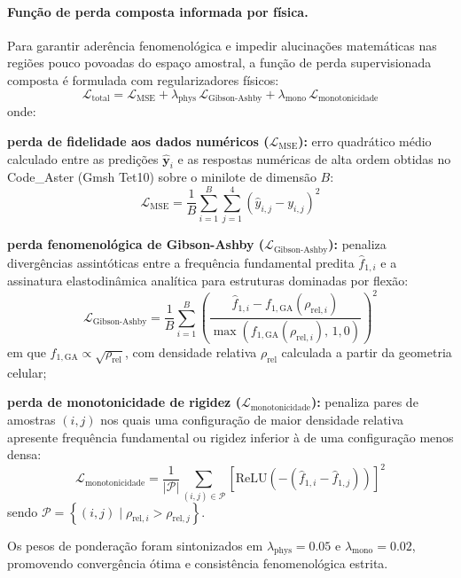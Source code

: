 \paragraph*{Função de perda composta informada por física.}
\label{par:perda}
Para garantir aderência fenomenológica e impedir alucinações matemáticas nas regiões pouco povoadas do espaço amostral, a função de perda supervisionada composta é formulada com regularizadores físicos:
\begin{equation}
  \mathcal{L}_{\text{total}} = \mathcal{L}_{\text{MSE}} + \lambda_{\text{phys}}\,\mathcal{L}_{\text{Gibson-Ashby}} + \lambda_{\text{mono}}\,\mathcal{L}_{\text{monotonicidade}}
  \label{eq:perda-total}
\end{equation}
onde:
\begin{alineas}
  \item \textbf{perda de fidelidade aos dados numéricos ($\mathcal{L}_{\text{MSE}}$):} erro quadrático médio calculado entre as predições $\hat{\mathbf{y}}_i$ e as respostas numéricas de alta ordem obtidas no Code\_Aster (Gmsh Tet10) sobre o minilote de dimensão $B$:
  \begin{equation}
    \mathcal{L}_{\text{MSE}} = \frac{1}{B} \sum_{i=1}^{B} \sum_{j=1}^{4} \left( \hat{y}_{i,j} - y_{i,j} \right)^{2}
    \label{eq:mse}
  \end{equation}
  \item \textbf{perda fenomenológica de Gibson-Ashby ($\mathcal{L}_{\text{Gibson-Ashby}}$):} penaliza divergências assintóticas entre a frequência fundamental predita $\hat{f}_{1,i}$ e a assinatura elastodinâmica analítica para estruturas dominadas por flexão:
  \begin{equation}
    \mathcal{L}_{\text{Gibson-Ashby}} = \frac{1}{B} \sum_{i=1}^{B} \left( \frac{\hat{f}_{1,i} - f_{1,\text{GA}}(\rho_{\text{rel},i})}{\max\!\left( f_{1,\text{GA}}(\rho_{\text{rel},i}),\, 1{,}0 \right)} \right)^{2}
    \label{eq:ga}
  \end{equation}
  em que $f_{1,\text{GA}} \propto \sqrt{\rho_{\text{rel}}}$, com densidade relativa $\rho_{\text{rel}}$ calculada a partir da geometria celular;
  \item \textbf{perda de monotonicidade de rigidez ($\mathcal{L}_{\text{monotonicidade}}$):} penaliza pares de amostras $(i,j)$ nos quais uma configuração de maior densidade relativa apresente frequência fundamental ou rigidez inferior à de uma configuração menos densa:
  \begin{equation}
    \mathcal{L}_{\text{monotonicidade}} = \frac{1}{|\mathcal{P}|} \sum_{(i,j) \in \mathcal{P}} \left[ \mathrm{ReLU}\!\left( -\left( \hat{f}_{1,i} - \hat{f}_{1,j} \right) \right) \right]^{2}
    \label{eq:mono}
  \end{equation}
  sendo $\mathcal{P} = \left\{ (i,j) \mid \rho_{\text{rel},i} > \rho_{\text{rel},j} \right\}$.
\end{alineas}
Os pesos de ponderação foram sintonizados em $\lambda_{\text{phys}} = \num{0.05}$ e $\lambda_{\text{mono}} = \num{0.02}$, promovendo convergência ótima e consistência fenomenológica estrita.

